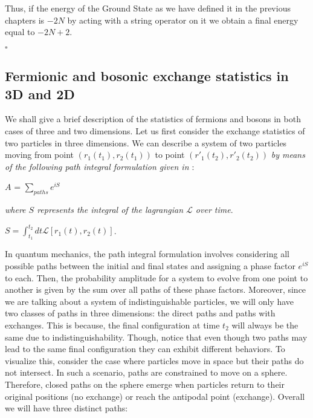 \documentclass{Configuration_Files/PoliMi3i_thesis}
\begin{document}
Thus, if the energy of the Ground State as we have defined it in the previous chapters is $-2N$ by acting with a string operator on  it we obtain a final energy equal to $-2N+2$.

\hfill $\square$ 







\subsection{Fermionic and bosonic exchange statistics in 3D and 2D}
We shall give a brief description of the statistics of fermions and bosons in both cases of three and two dimensions.
Let us first consider the exchange statistics of two particles in three dimensions.  We can describe a system of two particles moving from point $(r_1(t_1),r_2(t_1))$ to point $(r'_1(t_2),r'_2(t_2))$ \textit{by means of the following path integral formulation given in \cite{Rao16}}:

\begin{center}
	$A$ = $\sum_{paths} e^{iS}$
\end{center}

\textit{where $S$ represents the integral of the lagrangian $\mathcal{L}$ over time}.

\begin{center}
	$S = \int_{t_1}^{t_2}dt \textit{$\mathcal{L}$} [ r_1(t),r_2(t) ] $.
\end{center}

In quantum mechanics, the path integral formulation involves considering all possible paths between the initial and final states and assigning a phase factor $e^{iS}$ to each.\newline
Then, the probability amplitude for a system to evolve from one point to another is given by the sum over all paths of these phase factors.\newline
Moreover, since we are talking about a system of indistinguishable particles, we will only have two classes of paths in three dimensions: the direct paths and paths with exchanges. This is because, the final configuration at time $t_2$ will always be the same due to indistinguishability. Though, notice that even though two paths may lead to the same final configuration they can exhibit different behaviors. To visualize this, consider the case where particles move in space but their paths do not intersect. In such a scenario, paths are constrained to move on a sphere. Therefore, closed paths on the sphere emerge when particles return to their original positions (no exchange) or reach the antipodal point (exchange). Overall we will have three distinct paths: 
\end{document}
